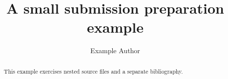 \documentclass{article}
\title{A small submission preparation example}
\author{Example Author}
\date{}
\begin{document}
\maketitle
\begin{abstract}
This example exercises nested source files and a separate bibliography.
\end{abstract}




\end{document}
